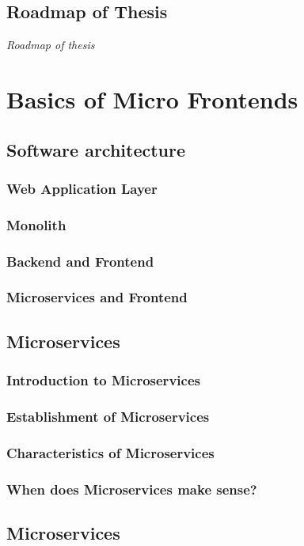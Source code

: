 \documentclass[a4paper]{book}
\begin{document}
\section{Roadmap of Thesis }
 \textit{Roadmap of thesis}
 
\chapter{Basics of Micro Frontends }
\section{Software architecture}
\subsection{Web Application Layer}
\subsection{Monolith}
\subsection{Backend and Frontend}
\subsection{Microservices and Frontend}
\section{Microservices}
\subsection{Introduction to Microservices}
\subsection{Establishment of Microservices}
\subsection{Characteristics of Microservices}
\subsection{When does Microservices make sense?}
\section{Microservices}
\end{document}
